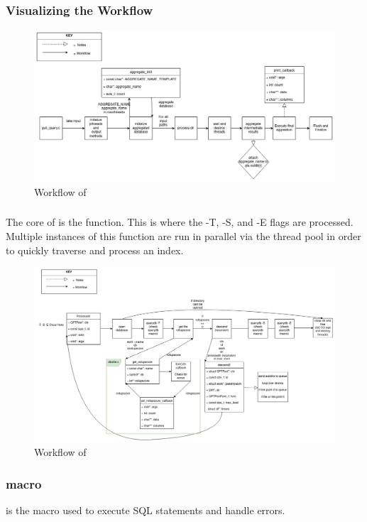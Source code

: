 \subsubsection{Visualizing the Workflow}
\begin{figure} [H]
  \centering
  \includegraphics[width=\textwidth]{images/gufi_query_main.png}
  \caption{Workflow of \gufiquery}
\end{figure}

\subsubsection{\processdir}
The core of \gufiquery is the \processdir function. This is where the
-T, -S, and -E flags are processed. Multiple instances of this
function are run in parallel via the thread pool in order to quickly
traverse and process an index.

\begin{figure} [H]
  \centering
  \includegraphics[width=\textwidth]{images/gufi_query_processdir.png}
  \caption{Workflow of \processdir}
\end{figure}

\subsubsection{\querydb macro}
\querydb is the macro used to execute SQL statements and handle errors.

